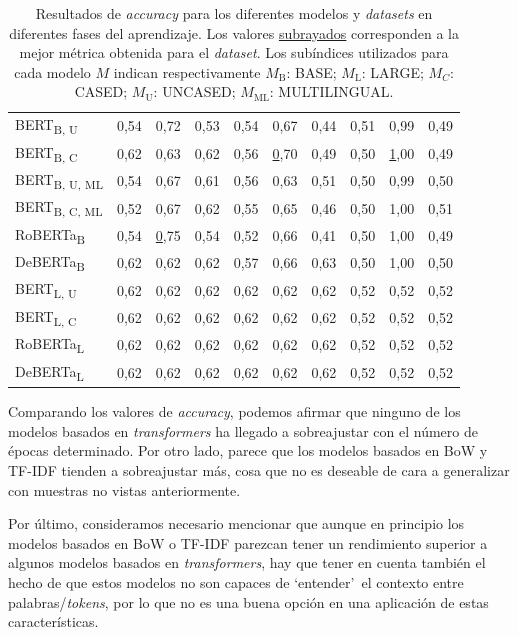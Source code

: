 \begin{table}[!h]
\begin{tabular}{lrrrrrrrrr}
        {BERT}\textsubscript{B, U} & 0,54 & 0,72 & 0,53 & 0,54 & 0,67 & 0,44 & 0,51 & 0,99 & 0,49 \\
        {BERT}\textsubscript{B, C} & 0,62 & 0,63 & 0,62 & 0,56 & {\ul 0,70} & 0,49 & 0,50 & {\ul 1,00} & 0,49 \\
        {BERT}\textsubscript{B, U, ML} & 0,54 & 0,67 & 0,61 & 0,56 & 0,63 & 0,51 & 0,50 & 0,99 & 0,50 \\
        {BERT}\textsubscript{B, C, ML} & 0,52 & 0,67 & 0,62 & 0,55 & 0,65 & 0,46 & 0,50 & 1,00 & 0,51 \\ \hline
        {RoBERTa}\textsubscript{B} & 0,54 & {\ul 0,75} & 0,54 & 0,52 & 0,66 & 0,41 & 0,50 & 1,00 & 0,49 \\ \hline
        {DeBERTa}\textsubscript{B} & 0,62 & 0,62 & 0,62 & 0,57 & 0,66 & 0,63 & 0,50 & 1,00 & 0,50 \\ \hline
        {BERT}\textsubscript{L, U} & 0,62 & 0,62 & 0,62 & 0,62 & 0,62 & 0,62 & 0,52 & 0,52 & 0,52 \\
        {BERT}\textsubscript{L, C} & 0,62 & 0,62 & 0,62 & 0,62 & 0,62 & 0,62 & 0,52 & 0,52 & 0,52 \\ \hline
        {RoBERTa}\textsubscript{L} & 0,62 & 0,62 & 0,62 & 0,62 & 0,62 & 0,62 & 0,52 & 0,52 & 0,52 \\ \hline
        {DeBERTa}\textsubscript{L} & 0,62 & 0,62 & 0,62 & 0,62 & 0,62 & 0,62 & 0,52 & 0,52 & 0,52 \\ \hline
    \end{tabular}
\caption{Resultados de \textit{accuracy} para los diferentes modelos y \textit{datasets} en diferentes fases del aprendizaje. Los valores \underline{subrayados} corresponden a la mejor métrica obtenida para el \textit{dataset}. Los subíndices utilizados para cada modelo $M$ indican respectivamente $M_{\text{B}}$: BASE; $M_{\text{L}}$: LARGE; $M_{C}$: CASED; $M_{\text{U}}$: UNCASED; $M_{\text{ML}}$: MULTILINGUAL.}
\label{tab:train-eval-test}
\end{table}

Comparando los valores de \textit{accuracy}, podemos afirmar que ninguno de los modelos basados en \textit{transformers} ha llegado a sobreajustar con el número de épocas determinado.
Por otro lado, parece que los modelos basados en BoW y TF-IDF tienden a sobreajustar más, cosa que no es deseable de cara a generalizar con muestras no vistas anteriormente.

Por último, consideramos necesario mencionar que aunque en principio los modelos basados en BoW o TF-IDF parezcan tener un rendimiento superior a algunos modelos basados en \textit{transformers}, hay que tener en cuenta también el hecho de que estos modelos no son capaces de `entender'\ el contexto entre palabras/\textit{tokens}, por lo que no es una buena opción en una aplicación de estas características.

